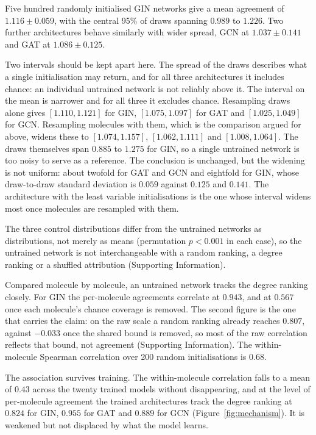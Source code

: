 \documentclass[journal=jcisd8,manuscript=article]{achemso}
\begin{document}
Five hundred randomly initialised GIN networks give a mean agreement of $1.116 \pm 0.059$,
with the central 95\% of draws spanning $0.989$ to $1.226$. Two further architectures behave
similarly with wider spread, GCN at $1.037 \pm 0.141$ and GAT at $1.086 \pm 0.125$.

Two intervals should be kept apart here. The spread of the draws describes what a single
initialisation may return, and for all three architectures it includes chance: an individual
untrained network is not reliably above it. The interval on the mean is narrower and for all
three it excludes chance. Resampling draws alone gives $[1.110, 1.121]$ for GIN, $[1.075, 1.097]$ for GAT and
$[1.025, 1.049]$ for GCN. Resampling molecules with them, which is the comparison argued for
above, widens these to $[1.074, 1.157]$, $[1.062, 1.111]$ and $[1.008, 1.064]$. The draws
themselves span $0.885$ to $1.275$ for GIN, so a single untrained network is too noisy to
serve as a reference. The conclusion
is unchanged, but the widening is not uniform: about twofold for GAT and GCN and eightfold for
GIN, whose draw-to-draw standard deviation is $0.059$ against $0.125$ and $0.141$. The
architecture with the least variable initialisations is the one whose interval widens most
once molecules are resampled with them.

The three control distributions differ from the untrained networks as distributions, not merely as means (permutation $p < 0.001$ in each case), so the untrained network is not
interchangeable with a random ranking, a degree ranking or a shuffled attribution
(Supporting Information).

Compared molecule by molecule, an untrained network tracks the degree ranking closely. For GIN
the per-molecule agreements correlate at $0.943$, and at $0.567$ once each molecule's chance
coverage is removed. The second figure is the one that carries the claim: on the raw scale a
random ranking already reaches $0.807$, against $-0.033$ once the shared bound is removed, so
most of the raw correlation reflects that bound, not agreement (Supporting
Information). The within-molecule Spearman correlation over 200 random initialisations is
$0.68$.

The association survives training. The within-molecule correlation falls to a mean of $0.43$
across the twenty trained models without disappearing, and at the level of per-molecule
agreement the trained architectures track the degree ranking at $0.824$ for GIN, $0.955$ for
GAT and $0.889$ for GCN (Figure~\ref{fig:mechanism}). It is weakened but not displaced by what
the model learns.
\end{document}
